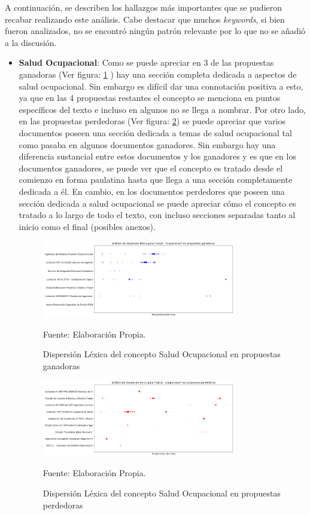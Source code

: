     A continuación, se describen los hallazgos más importantes que se pudieron recabar realizando este análisis. Cabe destacar que muchos \textit{keywords}, si bien fueron analizados, no se encontró ningún patrón relevante por lo que no se añadió a la discusión.
    
    \begin{itemize}
        \item \textbf{Salud Ocupacional}: Como se puede apreciar en 3 de las propuestas ganadoras (Ver figura: \ref{fig:SO_Win} ) hay una sección completa dedicada a aspectos de salud ocupacional. Sin embargo es difícil dar una connotación positiva a esto, ya que en las 4 propuestas restantes el concepto se menciona en puntos específicos del texto e incluso en algunos no se llega a nombrar. Por otro lado, en las propuestas perdedoras (Ver figura: \ref{fig:SO_Loss}) se puede apreciar que varios documentos poseen una sección dedicada a temas de salud ocupacional tal como pasaba en algunos documentos ganadores. Sin embargo hay una diferencia sustancial entre estos documentos y los ganadores y es que en los documentos ganadores, se puede ver que el concepto es tratado desde el comienzo en forma paulatina hasta que llega a una sección completamente dedicada a él. En cambio, en los documentos perdedores que poseen una sección dedicada a salud ocupacional se puede apreciar cómo el concepto es tratado a lo largo de todo el texto, con incluso secciones separadas tanto al inicio como el final (posibles anexos). 
        
        \begin{figure}[H]
        \centering
        \includegraphics[width=0.8\textwidth]{figures/KeyWords/DispersionPlot_(salud,ocupacional)_blue.png}
        \caption{\label{fig:SO_Win} Dispersión Léxica del concepto Salud Ocupacional en propuestas ganadoras} Fuente: Elaboración Propia.
        \end{figure}
            
        \begin{figure}[H]
        \centering
        \includegraphics[width=0.8\textwidth]{figures/KeyWords/DispersionPlot_(salud,ocupacional)_red.png}
        \caption{\label{fig:SO_Loss} Dispersión Léxica del concepto Salud Ocupacional en propuestas perdedoras} Fuente: Elaboración Propia.
        \end{figure}
        

\end{itemize}
